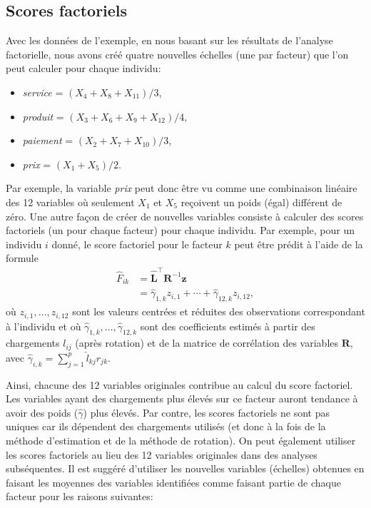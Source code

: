 \documentclass[
]{book}
\providecommand{\tightlist}{%
  \setlength{\itemsep}{0pt}\setlength{\parskip}{0pt}}
\theoremstyle{definition}
\theoremstyle{definition}
\theoremstyle{definition}
\theoremstyle{remark}
\begin{document}
\hypertarget{scores-factoriels}{%
\subsection{Scores factoriels}\label{scores-factoriels}}

Avec les données de l'exemple, en nous basant sur les résultats de l'analyse factorielle, nous avons créé quatre nouvelles échelles (une par facteur) que l'on peut calculer pour chaque individu:

\begin{itemize}
\tightlist
\item
  \emph{service} = \((X_4+X_8+X_{11})/3\),
\item
  \emph{produit} = \((X_3+X_6+X_9+X_{12})/4\),
\item
  \emph{paiement} = \((X_2+X_7+X_{10})/3\),
\item
  \emph{prix} = \((X_1+X_5)/2\).
\end{itemize}

Par exemple, la variable \emph{prix} peut donc être vu comme une combinaison linéaire des 12
variables où seulement \(X_1\) et \(X_5\) reçoivent un poids (égal) différent de zéro. Une autre façon de créer de nouvelles variables consiste à calculer des scores factoriels (un pour chaque facteur) pour chaque individu. Par exemple, pour un individu \(i\) donné, le score factoriel pour le facteur \(k\) peut être prédit à l'aide de la formule
\begin{align*}
\hat{F}_{ik} &= \widehat{\mathbf{L}}^{\top}\mathbf{R}^{-1}\boldsymbol{z}\\&=
\widehat{\gamma}_{1, k} z_{i, 1} + \cdots + \widehat{\gamma}_{12, k}z_{i, 12}, 
\end{align*}
où \(z_{i, 1}, \ldots, z_{i, 12}\) sont les valeurs centrées et réduites des observations correspondant à l'individu et où \(\widehat{\gamma}_{1, k}, \ldots, \widehat{\gamma}_{12, k}\) sont des coefficients estimés à partir des chargements \(l_{ij}\) (après rotation) et de la matrice de corrélation des variables \(\mathbf{R}\), avec \(\widehat{\gamma}_{i, k}=\sum_{j=1}^p \hat{l}_{kj}r_{jk}\).

Ainsi, chacune des 12 variables originales contribue au calcul du score
factoriel. Les variables ayant des chargements plus élevés sur ce facteur auront tendance à avoir des poids (\(\widehat{\gamma}\)) plus élevés. Par contre, les scores factoriels ne sont pas uniques car ils dépendent des chargements utilisés (et donc à la fois de la méthode d'estimation et de la méthode de rotation).
On peut également utiliser les scores factoriels au lieu des 12 variables
originales dans des analyses subséquentes. Il est suggéré d'utiliser les nouvelles variables (échelles) obtenues en faisant les moyennes des variables identifiées comme faisant partie de chaque facteur pour les raisons suivantes:
\end{document}
